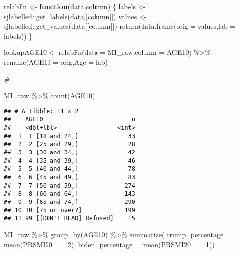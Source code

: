 \documentclass[
]{article}
\newenvironment{Shaded}{\begin{snugshade}}{\end{snugshade}}
\newcommand{\AttributeTok}[1]{\textcolor[rgb]{0.77,0.63,0.00}{#1}}
\newcommand{\CommentTok}[1]{\textcolor[rgb]{0.56,0.35,0.01}{\textit{#1}}}
\newcommand{\ControlFlowTok}[1]{\textcolor[rgb]{0.13,0.29,0.53}{\textbf{#1}}}
\newcommand{\DecValTok}[1]{\textcolor[rgb]{0.00,0.00,0.81}{#1}}
\newcommand{\FunctionTok}[1]{\textcolor[rgb]{0.00,0.00,0.00}{#1}}
\newcommand{\NormalTok}[1]{#1}
\newcommand{\OtherTok}[1]{\textcolor[rgb]{0.56,0.35,0.01}{#1}}
\newcommand{\SpecialCharTok}[1]{\textcolor[rgb]{0.00,0.00,0.00}{#1}}
\newcommand{\StringTok}[1]{\textcolor[rgb]{0.31,0.60,0.02}{#1}}
\begin{document}
\begin{Shaded}
\begin{Highlighting}[]
\NormalTok{relabFn }\OtherTok{\textless{}{-}} \ControlFlowTok{function}\NormalTok{(data,column) \{ }
\NormalTok{  labels }\OtherTok{\textless{}{-}}\NormalTok{ sjlabelled}\SpecialCharTok{::}\FunctionTok{get\_labels}\NormalTok{(data[[column]])}
\NormalTok{  values }\OtherTok{\textless{}{-}}\NormalTok{ sjlabelled}\SpecialCharTok{::}\FunctionTok{get\_values}\NormalTok{(data[[column]])}
  \FunctionTok{return}\NormalTok{(}\FunctionTok{data.frame}\NormalTok{(}\AttributeTok{orig =}\NormalTok{ values,}\AttributeTok{lab =}\NormalTok{ labels))}
\NormalTok{\}}

\NormalTok{lookupAGE10 }\OtherTok{\textless{}{-}} \FunctionTok{relabFn}\NormalTok{(}\AttributeTok{data =}\NormalTok{ MI\_raw,}\AttributeTok{column =} \StringTok{\textquotesingle{}AGE10\textquotesingle{}}\NormalTok{) }\SpecialCharTok{\%\textgreater{}\%}
  \FunctionTok{rename}\NormalTok{(}\AttributeTok{AGE10 =}\NormalTok{ orig,}\AttributeTok{Age =}\NormalTok{ lab)}

\CommentTok{\#}

\NormalTok{MI\_raw }\SpecialCharTok{\%\textgreater{}\%} 
  \FunctionTok{count}\NormalTok{(AGE10)}
\end{Highlighting}
\end{Shaded}

\begin{verbatim}
## # A tibble: 11 x 2
##    AGE10                         n
##    <dbl+lbl>                 <int>
##  1  1 [18 and 24,]              33
##  2  2 [25 and 29,]              28
##  3  3 [30 and 34,]              42
##  4  4 [35 and 39,]              46
##  5  5 [40 and 44,]              78
##  6  6 [45 and 49,]              83
##  7  7 [50 and 59,]             274
##  8  8 [60 and 64,]             143
##  9  9 [65 and 74,]             290
## 10 10 [75 or over?]            199
## 11 99 [[DON'T READ] Refused]    15
\end{verbatim}

\begin{Shaded}
\begin{Highlighting}[]
\NormalTok{MI\_raw }\SpecialCharTok{\%\textgreater{}\%}
  \FunctionTok{group\_by}\NormalTok{(AGE10) }\SpecialCharTok{\%\textgreater{}\%}
  \FunctionTok{summarize}\NormalTok{( }\AttributeTok{trump\_percentage =} \FunctionTok{mean}\NormalTok{(PRSMI20 }\SpecialCharTok{==} \DecValTok{2}\NormalTok{), }\AttributeTok{biden\_percentage =} \FunctionTok{mean}\NormalTok{(PRSMI20 }\SpecialCharTok{==} \DecValTok{1}\NormalTok{))}
\end{Highlighting}
\end{Shaded}
\end{document}
